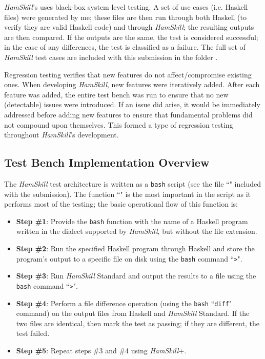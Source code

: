 \documentclass{report}
\begin{document}
\textit{HamSkill}'s uses black-box system level testing.  A set of use cases (i.e. Haskell files) were generated by me; these files are then run through both Haskell (to verify they are valid Haskell code) and through \textit{HamSkill}; the resulting outputs are then compared.  If the outputs are the same, the test is considered successful; in the case of any differences, the test is classified as a failure.  The full set of \textit{HamSkill} test cases are included with this submission in the folder .

Regression testing verifies that new features do not affect/compromise existing ones.  When developing \textit{HamSkill}, new features were iteratively added.  After each feature was added, the entire test bench was run to ensure that no new (detectable) issues were introduced.  If an issue did arise, it would be immediately addressed before adding new features to ensure that fundamental problems did not compound upon themselves. This formed a type of regression testing throughout \textit{HamSkill}'s development.

\subsection{Test Bench Implementation Overview}

The \textit{HamSkill} test architecture is written as a \texttt{bash} script (see the file ``" included with the submission).  The function ``" is the most important in the script as it performs most of the testing; the basic operational flow of this function is:

\begin{itemize}

\item \textbf{Step \#1}: Provide the \texttt{bash} function with the name of a Haskell program written in the dialect supported by \textit{HamSkill}, but without the file extension.

\item \textbf{Step \#2}: Run the specified Haskell program through Haskell and store the program's output to a specific file on disk using the \texttt{bash} command ``\texttt{>}". 

\item\label{item:runHamSkillStandard} \textbf{Step \#3}: Run \textit{HamSkill} Standard and output the results to a file using the \texttt{bash} command ``\texttt{>}". 

\item\label{item:diffHamSkillStandard} \textbf{Step \#4}: Perform a file difference operation (using the \texttt{bash} ``\texttt{diff}" command) on the output files from Haskell and \textit{HamSkill} Standard.  If the two files are identical, then mark the test as passing; if they are different, the test failed.
 
\item \textbf{Step \#5}: Repeat steps \#3 and \#4 using \textit{HamSkill}+.

\end{itemize}
\end{document}

